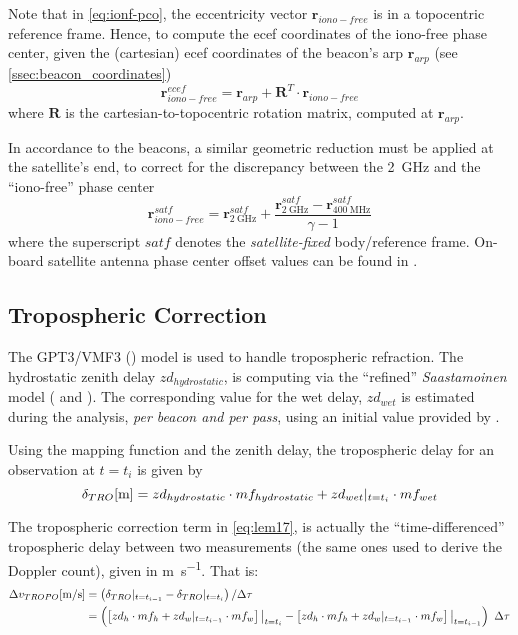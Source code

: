 Note that in \autoref{eq:ionf-pco}, the eccentricity vector $\bm{r}_{iono-free}$ 
is in a topocentric reference frame. Hence, to compute the \gls{ecef} coordinates of the 
iono-free phase center, given the (cartesian) \gls{ecef} coordinates of the beacon's 
\gls{arp} $\bm{r}_{arp}$ (see \ref{ssec:beacon_coordinates})
\begin{equation}
  \bm{r}^{ecef}_{iono-free} = \bm{r}_{arp} + \bm{R}^T \cdot \bm{r}_{iono-free}
  \label{eq:arp-to-if-pc}
\end{equation}
where $\bm{R}$ is the cartesian-to-topocentric rotation matrix, computed 
at $\bm{r}_{arp}$.

In accordance to the beacons, a similar geometric reduction must be applied 
at the satellite's end, to correct for the discrepancy between the \SI{2}{\GHz} 
and the ``iono-free'' phase center
\begin{equation}
  \bm{r}^{satf}_{iono-free} = \bm{r}^{satf}_{\SI{2}{\GHz}} + 
    \frac{\bm{r}^{satf}_{\SI{2}{\GHz}} - 
    \bm{r}^{satf}_{\SI{400}{\MHz}}}{\gamma - 1}
\end{equation}
where the superscript $satf$ denotes the \emph{satellite-fixed} body/reference 
frame. On-board satellite antenna phase center offset values can be found in 
\cite{DorisSatModels}.

\subsection{Tropospheric Correction}\label{ssec-tropospheric-correction}
The GPT3/VMF3 (\cite{Landskron2018}) model is used to handle tropospheric refraction. 
The hydrostatic zenith delay $zd_{hydrostatic}$, is computing via the ``refined'' 
\emph{Saastamoinen} model (\cite{Davisetal85} and \cite{Saastamoinen72}). 
The corresponding value for the wet delay, $zd_{wet}$ is estimated during the 
analysis, \emph{per beacon and per pass}, using an initial value provided by 
\cite{Askneetal87}.

Using the mapping function and the zenith delay, the tropospheric 
delay for an observation at $t=t_i$ is given by
\begin{equation}\label{eq:tropo-delay}
  \delta _{TRO} [\si{\m}] = zd_{hydrostatic} \cdot mf_{hydrostatic} + zd_{wet}\at{t=t_i} \cdot mf_{wet}
\end{equation}

The tropospheric correction term in \autoref{eq:lem17}, is actually the ``time-differenced'' 
tropospheric delay between two measurements (the same ones used to derive the 
Doppler count), given in \si{\m \per \s}. That is:
\begin{equation}\label{eq:dtrop-diff}
  \begin{aligned}
    \Delta v_{TROPO} [\si{\m \per \s}] 
      &= \left( \delta _{TRO} \at{t=t_{i-1}} - \delta _{TRO} \at{t=t_{i}} \right) / \Delta \tau\\
      &= \left( \left[ zd_{h} \cdot mf_{h} + zd_{w}\at{t=t_{i-1}} \cdot mf_{w} \right]\at[\big]{t=t_i} - 
        \left[ zd_{h} \cdot mf_{h} + zd_{w}\at{t=t_{i-1}} \cdot mf_{w} \right]\at[\big]{t=t_{i-1}} \right) \ \Delta \tau
  \end{aligned}
\end{equation}

